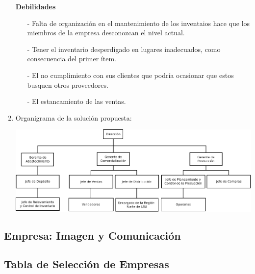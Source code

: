 \documentclass[a4paper,10pt,titlepage]{article}
\begin{document}
\begin{enumerate}
    \textbf{Debilidades}  
 
  \begin{enumerate}
      \item[-] Falta de organización en el mantenimiento de los inventaios hace que los miembros de la empresa desconozcan el nivel actual. 
      \item[-] Tener el inventario desperdigado en lugares inadecuados, como consecuencia del primer ítem.
      \item[-] El no cumplimiento con sus clientes que podría ocasionar que estos busquen otros proveedores.
      \item[-] El estancamiento de las ventas.
  
   \end{enumerate} 
   
   \newpage
   
\item Organigrama de la soluci\'on propuesta:
\begin{center}
      \includegraphics[angle=90, scale=0.60]{./Organigramas/Emporio2.png}
     \end{center}

\end{enumerate}

\newpage
\vspace*{\fill}
\begin{center}
\begingroup
\titlerule
\vspace{1cm}
\section{Empresa: Imagen y Comunicaci\'on}
\vspace{1cm}
\titlerule
\endgroup
\end{center}
\vspace*{\fill}

\newpage

\subsection{Tabla de Selecci\'on de Empresas}
\end{document}
